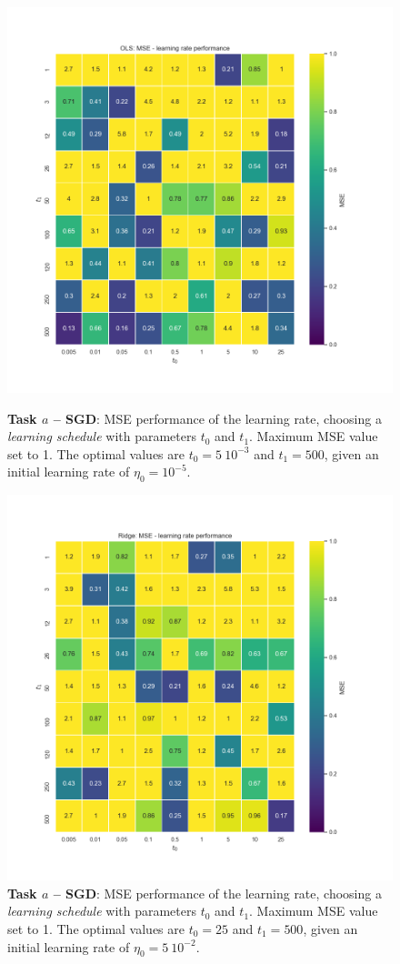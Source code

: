 \documentclass[english,notitlepage,reprint,nofootinbib]{revtex4-1}  %
\begin{document}
\begin{figure}[h]
    \centering 
    \includegraphics[scale=0.3]{SGD/SGD_eta_OLS.png}
    \caption{\textbf{Task $a$ – SGD}: MSE performance of the learning rate, choosing a \textit{learning schedule} with parameters $t_0$ and $t_1$. Maximum MSE value set to 1. The optimal values are $t_0 = 5 \ 10^{-3}$ and $t_1 = 500$, given an initial learning rate of $\eta_0=10^{-5}$.}
    \label{fig:eta0_ols}
    \centering 
    \includegraphics[scale=0.3]{SGD/SGD_eta_Ridge.png}
    \caption{\textbf{Task $a$ – SGD}: MSE performance of the learning rate, choosing a \textit{learning schedule} with parameters $t_0$ and $t_1$. Maximum MSE value set to 1. The optimal values are $t_0 = 25$ and $t_1 = 500$, given an initial learning rate of $\eta_0=5 \ 10^{-2}$.}
    \label{fig:eta0_ridge}
\end{figure}
\end{document}
